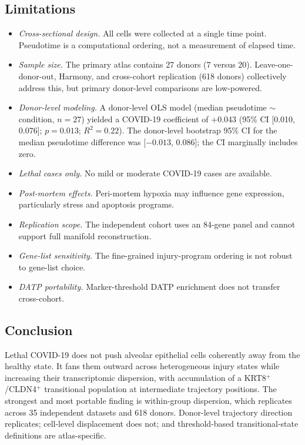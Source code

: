 \documentclass[11pt,a4paper]{article}
\begin{document}
\subsection{Limitations}

\begin{itemize}
\item \textit{Cross-sectional design.} All cells were collected at a single time point. Pseudotime is a computational ordering, not a measurement of elapsed time.
\item \textit{Sample size.} The primary atlas contains 27 donors (7 versus 20). Leave-one-donor-out, Harmony, and cross-cohort replication (618 donors) collectively address this, but primary donor-level comparisons are low-powered.
\item \textit{Donor-level modeling.} A donor-level OLS model (median pseudotime $\sim$ condition, $n = 27$) yielded a COVID-19 coefficient of +0.043 (95\% CI [0.010, 0.076]; $p = 0.013$; $R^{2} = 0.22$). The donor-level bootstrap 95\% CI for the median pseudotime difference was [$-0.013$, 0.086]; the CI marginally includes zero.
\item \textit{Lethal cases only.} No mild or moderate COVID-19 cases are available.
\item \textit{Post-mortem effects.} Peri-mortem hypoxia may influence gene expression, particularly stress and apoptosis programs.
\item \textit{Replication scope.} The independent cohort uses an 84-gene panel and cannot support full manifold reconstruction.
\item \textit{Gene-list sensitivity.} The fine-grained injury-program ordering is not robust to gene-list choice.
\item \textit{DATP portability.} Marker-threshold DATP enrichment does not transfer cross-cohort.
\end{itemize}

\subsection{Conclusion}

Lethal COVID-19 does not push alveolar epithelial cells coherently away from the
healthy state. It fans them outward across heterogeneous injury states while
increasing their transcriptomic dispersion, with accumulation of a
KRT8$^+$/CLDN4$^+$ transitional population at intermediate trajectory positions.
The strongest and most portable finding is within-group dispersion, which
replicates across 35 independent datasets and 618 donors. Donor-level trajectory
direction replicates; cell-level displacement does not; and threshold-based
transitional-state definitions are atlas-specific.
\end{document}

